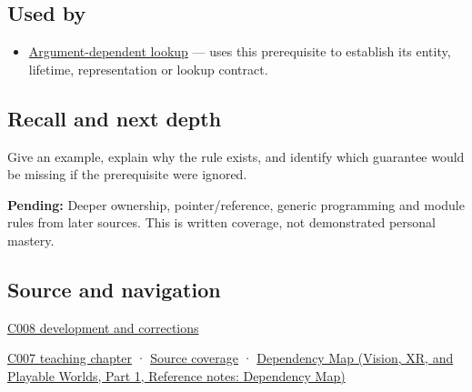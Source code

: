 \subsection{Used by}\label{appendix-b12b31759da1-used-by}

\hypertarget{appendix-b12b31759da1-used-by}{}

\begin{itemize}
\tightlist
\item
  \hyperref[appendix-7863714aa97f]{Argument-dependent lookup} --- uses this prerequisite to establish its entity, lifetime, representation or lookup contract.
\end{itemize}

\subsection{Recall and next depth}\label{appendix-b12b31759da1-recall-and-next-depth}

\hypertarget{appendix-b12b31759da1-recall-and-next-depth}{}

Give an example, explain why the rule exists, and identify which guarantee would be missing if the prerequisite were ignored.

\textbf{Pending:} Deeper ownership, pointer/reference, generic programming and module rules from later sources. This is written coverage, not demonstrated personal mastery.

\subsection{Source and navigation}\label{appendix-b12b31759da1-source-and-navigation}

\hypertarget{appendix-b12b31759da1-source-and-navigation}{}

\hyperref[appendix-fd090d982a15-m008---parts-113-126]{C008 development and corrections}

\hyperref[01-foundations-i-ch002-a-spelling-needs-a-place-and-a-meaning]{C007 teaching chapter} · \hyperref[appendix-fd090d982a15-m007---parts-101-112]{Source coverage} · \href{../07-Vision-XR-and-Playable-Worlds-P01/main.pdf\#appendix-4ad47bdd269a}{Dependency Map (Vision, XR, and Playable Worlds, Part 1, Reference notes: Dependency Map)}
